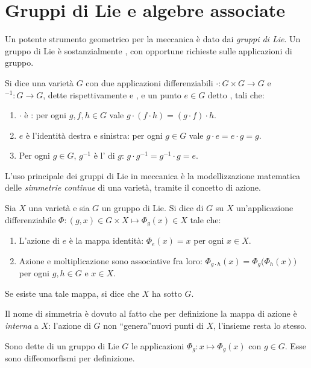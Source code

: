 \section{Gruppi di Lie e algebre associate}
Un potente strumento geometrico per la meccanica è dato dai \emph{gruppi di Lie}. Un gruppo di Lie è sostanzialmente , con opportune richieste sulle applicazioni di gruppo.
\begin{definition}
  Si dice  una varietà $G$ con due applicazioni differenziabili $\cdot: G \times G \to G$ e ${}^{-1}: G\to G$, dette rispettivamente  e , e un punto $e \in G$ detto , tali che:
  \begin{enumerate}
    \item $\cdot $ è : per ogni $g,f,h \in G$ vale $g\cdot (f\cdot h) = (g\cdot f) \cdot h$.
    \item $e$ è l'identità destra e sinistra: per ogni $g \in G$ vale $g \cdot e = e \cdot g = g$.
    \item Per ogni $g \in G$, $g^{-1}$ è l' di $g$: $g \cdot g^{-1} = g^{-1}\cdot g = e$.
  \end{enumerate}
\end{definition}

L'uso principale dei gruppi di Lie in meccanica è la modellizzazione matematica delle \emph{simmetrie continue} di una varietà, tramite il concetto di azione.
\begin{definition}
  Sia $X$ una varietà e sia $G$ un gruppo di Lie. Si dice  di $G$ su $X$ un'applicazione differenziabile $\Phi:(g,x) \in G \times X \mapsto \Phi_g(x) \in X$ tale che:
  \begin{enumerate}
    \item L'azione di $e$ è la mappa identità: $\Phi_e (x) = x$ per ogni $x \in X$.
    \item Azione e moltiplicazione sono associative fra loro: $\Phi_{g\cdot h} (x) = \Phi_g \big(\Phi_h (x)\big)$ per ogni $g,h \in G$ e $x \in X$.
  \end{enumerate}
Se esiste una tale mappa, si dice che $X$ ha  sotto $G$. 
\end{definition}
\begin{remark}
  Il nome di simmetria è dovuto al fatto che per definizione la mappa di azione è \emph{interna} a $X$: l'azione di $G$ non \textquotedblleft genera\textquotedblright nuovi punti di $X$, l'insieme resta lo stesso.
\end{remark}
\begin{remark}
  Sono dette  di un gruppo di Lie $G$ le applicazioni $\Phi_g: x \mapsto \Phi_g(x)$ con $g \in G$. Esse sono diffeomorfismi per definizione.
\end{remark}


